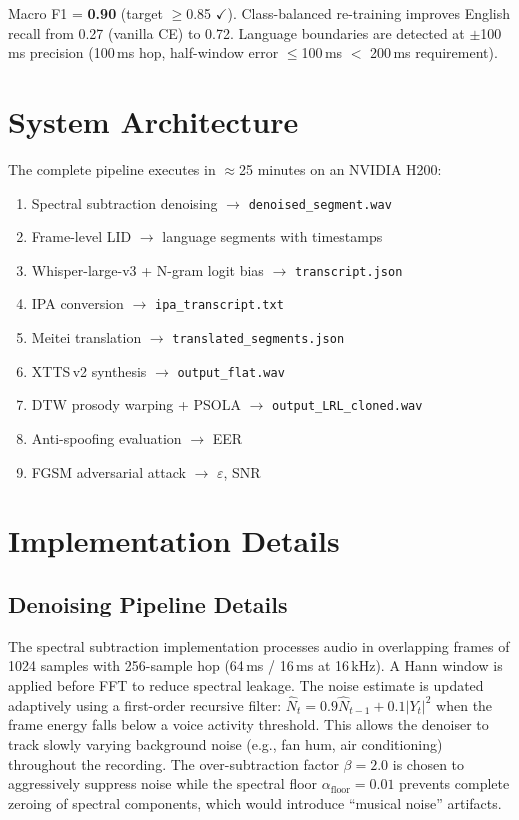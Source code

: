 \documentclass[11pt]{article}
\begin{document}
Macro F1 = \textbf{0.90} (target $\ge$0.85 $\checkmark$). Class-balanced
re-training improves English recall from 0.27 (vanilla CE) to 0.72.
Language boundaries are detected at $\pm$100\,ms precision (100\,ms hop,
half-window error $\le$100\,ms $<$ 200\,ms requirement).

\section{System Architecture}

The complete pipeline executes in $\approx$25 minutes on an NVIDIA H200:

\begin{enumerate}
  \item Spectral subtraction denoising $\to$ \texttt{denoised\_segment.wav}
  \item Frame-level LID $\to$ language segments with timestamps
  \item Whisper-large-v3 + N-gram logit bias $\to$ \texttt{transcript.json}
  \item IPA conversion $\to$ \texttt{ipa\_transcript.txt}
  \item Meitei translation $\to$ \texttt{translated\_segments.json}
  \item XTTS\,v2 synthesis $\to$ \texttt{output\_flat.wav}
  \item DTW prosody warping + PSOLA $\to$ \texttt{output\_LRL\_cloned.wav}
  \item Anti-spoofing evaluation $\to$ EER
  \item FGSM adversarial attack $\to$ $\varepsilon$, SNR
\end{enumerate}


\section{Implementation Details}

\subsection{Denoising Pipeline Details}

The spectral subtraction implementation processes audio in overlapping frames
of 1024 samples with 256-sample hop (64\,ms / 16\,ms at 16\,kHz).
A Hann window is applied before FFT to reduce spectral leakage.
The noise estimate is updated adaptively using a first-order recursive
filter: $\hat{N}_t = 0.9\hat{N}_{t-1} + 0.1|Y_t|^2$ when the frame
energy falls below a voice activity threshold. This allows the denoiser
to track slowly varying background noise (e.g., fan hum, air conditioning)
throughout the recording. The over-subtraction factor $\beta=2.0$ is chosen
to aggressively suppress noise while the spectral floor $\alpha_{\text{floor}}=0.01$
prevents complete zeroing of spectral components, which would introduce
``musical noise'' artifacts.
\end{document}
